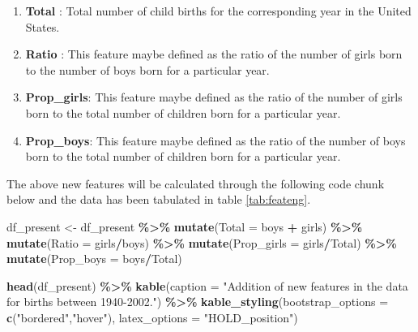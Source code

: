 \documentclass[11pt,a4paper,]{article}
\newenvironment{Shaded}{\begin{snugshade}}{\end{snugshade}}
\newcommand{\AttributeTok}[1]{\textcolor[rgb]{0.13,0.29,0.53}{#1}}
\newcommand{\FunctionTok}[1]{\textcolor[rgb]{0.13,0.29,0.53}{\textbf{#1}}}
\newcommand{\NormalTok}[1]{#1}
\newcommand{\OtherTok}[1]{\textcolor[rgb]{0.56,0.35,0.01}{#1}}
\newcommand{\SpecialCharTok}[1]{\textcolor[rgb]{0.81,0.36,0.00}{\textbf{#1}}}
\newcommand{\StringTok}[1]{\textcolor[rgb]{0.31,0.60,0.02}{#1}}
\providecommand{\tightlist}{%
  \setlength{\itemsep}{0pt}\setlength{\parskip}{0pt}}
\begin{document}
\begin{enumerate}
\def\labelenumi{\arabic{enumi}.}
\tightlist
\item
  \textbf{Total} : Total number of child births for the corresponding year in the United States.
\item
  \textbf{Ratio} : This feature maybe defined as the ratio of the number of girls born to the number of boys born for a particular year.
\item
  \textbf{Prop\_girls}: This feature maybe defined as the ratio of the number of girls born to the total number of children born for a particular year.
\item
  \textbf{Prop\_boys}: This feature maybe defined as the ratio of the number of boys born to the total number of children born for a particular year.
\end{enumerate}

The above new features will be calculated through the following code chunk below and the data has been tabulated in table \ref{tab:feateng}.

\tiny

\begin{Shaded}
\begin{Highlighting}[]
\NormalTok{df\_present }\OtherTok{\textless{}{-}}\NormalTok{ df\_present }\SpecialCharTok{\%\textgreater{}\%} \FunctionTok{mutate}\NormalTok{(}\AttributeTok{Total =}\NormalTok{ boys }\SpecialCharTok{+}\NormalTok{ girls) }\SpecialCharTok{\%\textgreater{}\%} 
  \FunctionTok{mutate}\NormalTok{(}\AttributeTok{Ratio =}\NormalTok{ girls}\SpecialCharTok{/}\NormalTok{boys) }\SpecialCharTok{\%\textgreater{}\%} 
  \FunctionTok{mutate}\NormalTok{(}\AttributeTok{Prop\_girls =}\NormalTok{ girls}\SpecialCharTok{/}\NormalTok{Total) }\SpecialCharTok{\%\textgreater{}\%} 
  \FunctionTok{mutate}\NormalTok{(}\AttributeTok{Prop\_boys =}\NormalTok{ boys}\SpecialCharTok{/}\NormalTok{Total)}

\FunctionTok{head}\NormalTok{(df\_present) }\SpecialCharTok{\%\textgreater{}\%} \FunctionTok{kable}\NormalTok{(}\AttributeTok{caption =} \StringTok{"Addition of new features in the data for births between 1940{-}2002."}\NormalTok{) }\SpecialCharTok{\%\textgreater{}\%} 
  \FunctionTok{kable\_styling}\NormalTok{(}\AttributeTok{bootstrap\_options =} \FunctionTok{c}\NormalTok{(}\StringTok{"bordered"}\NormalTok{,}\StringTok{"hover"}\NormalTok{),}
                                    \AttributeTok{latex\_options =} \StringTok{"HOLD\_position"}\NormalTok{) }
\end{Highlighting}
\end{Shaded}
\end{document}
